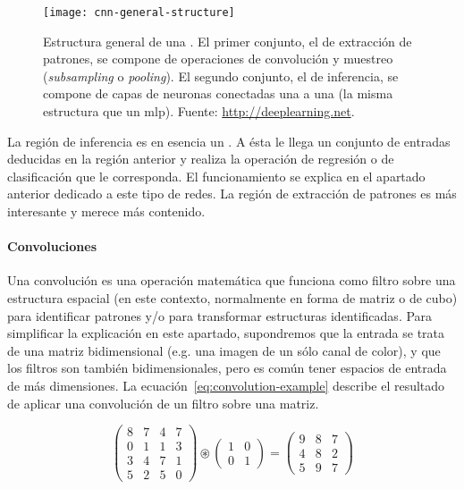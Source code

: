 \begin{figure}
	\texttt{[image: cnn-general-structure]}
	\caption[Estructura general de una ]{Estructura general de una . El primer conjunto, el de extracción de patrones, se compone de operaciones de convolución y muestreo (\textit{subsampling} o \textit{pooling}). El segundo conjunto, el de inferencia, se compone de capas de neuronas conectadas una a una (la misma estructura que un \acrshort{mlp}). Fuente: \url{http://deeplearning.net}.}
	\label{fig:cnn-general-structure}
\end{figure}

La región de inferencia es en esencia un . A ésta le llega un conjunto de entradas deducidas en la región anterior y realiza la operación de regresión o de clasificación que le corresponda. El funcionamiento se explica en el apartado anterior dedicado a este tipo de redes. La región de extracción de patrones es más interesante y merece más contenido.

\paragraph{Convoluciones}

Una convolución es una operación matemática que funciona como filtro sobre una estructura espacial (en este contexto, normalmente en forma de matriz o de cubo) para identificar patrones y/o para transformar estructuras identificadas. Para simplificar la explicación en este apartado, supondremos que la entrada se trata de una matriz bidimensional (e.g. una imagen de un sólo canal de color), y que los filtros son también bidimensionales, pero es común tener espacios de entrada de más dimensiones. La ecuación~\ref{eq:convolution-example} describe el resultado de aplicar una convolución de un filtro sobre una matriz.

\begin{equation*}
	\begin{pmatrix}
		8 & 7 & 4 & 7  \\
		0 & 1 & 1 & 3  \\
		3 & 4 & 7 & 1  \\
		5 & 2 & 5 & 0
	\end{pmatrix}
	\circledast
	\begin{pmatrix}
		1 & 0 \\
		0 & 1
	\end{pmatrix}
	=
	\begin{pmatrix}
		9 & 8 & 7  \\
		4 & 8 & 2  \\
		5 & 9 & 7
	\end{pmatrix}
	\label{eq:convolution-example}
\end{equation*}

